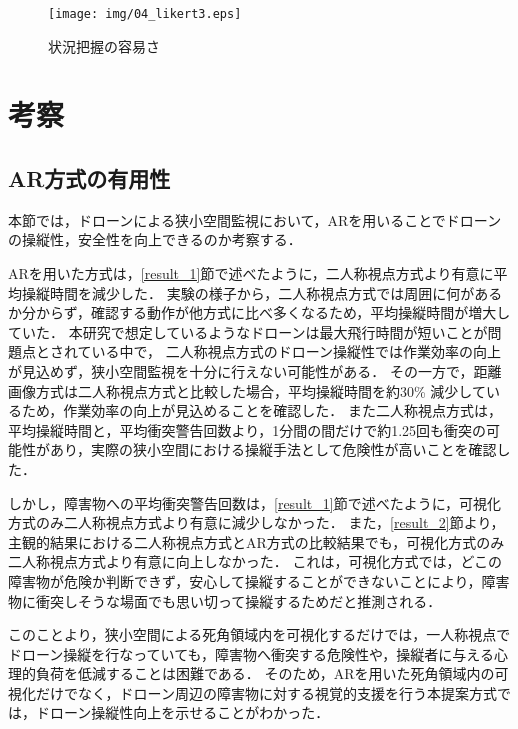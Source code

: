 \documentclass[submit, sigrecommended]{ipsj}
\begin{document}
\begin{figure}[tb]
  \centering
  \texttt{[image: img/04\_likert3.eps]}
  \caption{状況把握の容易さ}
  \label{fig:04_likert3}
  \end{figure}


\section{考察}
\subsection{AR方式の有用性}
\label{discussion1}
本節では，ドローンによる狭小空間監視において，ARを用いることでドローンの操縦性，安全性を向上できるのか考察する．
\par
ARを用いた方式は，\ref{result_1}節で述べたように，二人称視点方式より有意に平均操縦時間を減少した．
実験の様子から，二人称視点方式では周囲に何があるか分からず，確認する動作が他方式に比べ多くなるため，平均操縦時間が増大していた．
本研究で想定しているようなドローンは最大飛行時間が短いことが問題点とされている中で\cite{article-drone14}\cite{article-drone15}\cite{article-drone16}，
二人称視点方式のドローン操縦性では作業効率の向上が見込めず，狭小空間監視を十分に行えない可能性がある．
その一方で，距離画像方式は二人称視点方式と比較した場合，平均操縦時間を約30\% 減少しているため，作業効率の向上が見込めることを確認した．
また二人称視点方式は，平均操縦時間と，平均衝突警告回数より，1分間の間だけで約1.25回も衝突の可能性があり，実際の狭小空間における操縦手法として危険性が高いことを確認した．
\par
しかし，障害物への平均衝突警告回数は，\ref{result_1}節で述べたように，可視化方式のみ二人称視点方式より有意に減少しなかった．
また，\ref{result_2}節より，主観的結果における二人称視点方式とAR方式の比較結果でも，可視化方式のみ二人称視点方式より有意に向上しなかった．
これは，可視化方式では，どこの障害物が危険か判断できず，安心して操縦することができないことにより，障害物に衝突しそうな場面でも思い切って操縦するためだと推測される．
\par
このことより，狭小空間による死角領域内を可視化するだけでは，一人称視点でドローン操縦を行なっていても，障害物へ衝突する危険性や，操縦者に与える心理的負荷を低減することは困難である．
そのため，ARを用いた死角領域内の可視化だけでなく，ドローン周辺の障害物に対する視覚的支援を行う本提案方式では，ドローン操縦性向上を示せることがわかった．
\end{document}

